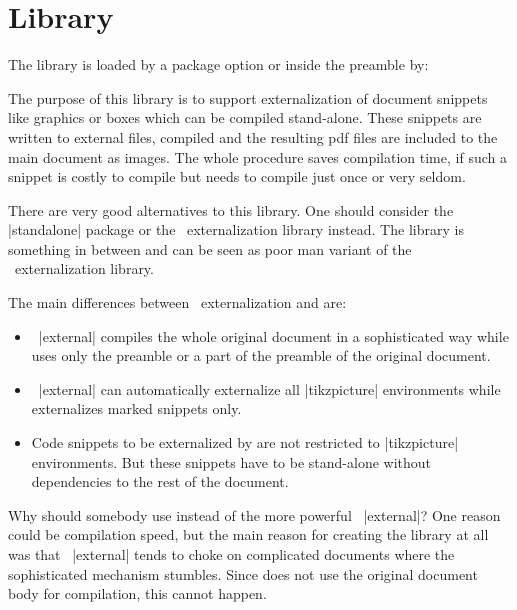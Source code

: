 \clearpage
\section{Library }\label{sec:external}%
%
The library is loaded by a package option or inside the preamble by:
\begin{dispListing}
\end{dispListing}

The purpose of this library is to support externalization of document
snippets like graphics or boxes which can be compiled stand-alone.
These snippets are written to external files, compiled and the resulting
pdf files are included to the main document as images.
The whole procedure saves compilation time, if such a snippet is costly to
compile but needs to compile just once or very seldom.

There are very good alternatives to this library. One should consider
the |standalone| package or the \tikzname\ externalization library instead.
The  library is something in between and can be seen as
poor man variant of the \tikzname\ externalization library.

The main differences between \tikzname\ externalization and  are:
\begin{itemize}
\item\tikzname\ |external| compiles the whole original document in a sophisticated
  way while  uses only the preamble or a part of the preamble
  of the original document.
\item\tikzname\ |external| can automatically externalize all |tikzpicture|
  environments while  externalizes marked snippets only.
\item Code snippets to be externalized by  are not restricted to
  |tikzpicture| environments. But these snippets have to be stand-alone without
  dependencies to the rest of the document.
\end{itemize}
Why should somebody use  instead of the more powerful \tikzname\ |external|?
One reason could be compilation speed, but the main reason for creating the
library at all was that \tikzname\ |external| tends to choke on complicated
documents where the sophisticated mechanism stumbles. Since  does
not use the original document body for compilation, this cannot happen.


